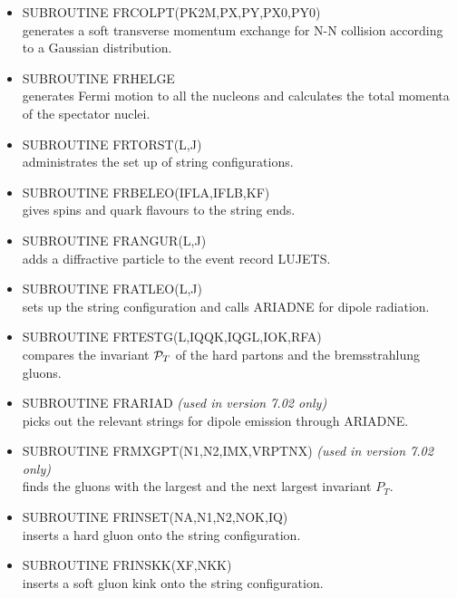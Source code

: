 \begin{itemize}
\item  SUBROUTINE FRCOLPT(PK2M,PX,PY,PX0,PY0) \\
 generates a soft transverse momentum exchange for N-N collision according
 to a Gaussian distribution.

\item  SUBROUTINE FRHELGE \\
 generates Fermi motion to all the nucleons and 
 calculates the total momenta of the spectator nuclei. 

\item  SUBROUTINE FRTORST(L,J) \\
 administrates the set up of string configurations.

\item  SUBROUTINE FRBELEO(IFLA,IFLB,KF) \\
 gives spins and quark flavours to the string ends.

\item  SUBROUTINE FRANGUR(L,J) \\
 adds a diffractive particle to the event record LUJETS.

\item  SUBROUTINE FRATLEO(L,J) \\
 sets up the string configuration and calls ARIADNE for dipole radiation.

\item  SUBROUTINE FRTESTG(L,IQQK,IQGL,IOK,RFA) \\
 compares the invariant ${\cal P}_T$ of the hard partons and the bremsstrahlung
 gluons.  

\item  SUBROUTINE FRARIAD  {\it (used in version 7.02 only)} \\
 picks out the relevant strings for dipole emission through ARIADNE.   

\item  SUBROUTINE FRMXGPT(N1,N2,IMX,VRPTNX) {\it (used in version 7.02 only)} \\
 finds the gluons with the largest and the next largest invariant $P_T$. 

\item  SUBROUTINE FRINSET(NA,N1,N2,NOK,IQ) \\
 inserts a hard gluon onto the string configuration.  

\item  SUBROUTINE FRINSKK(XF,NKK) \\
 inserts a soft gluon kink onto the string configuration.


\end{itemize}
